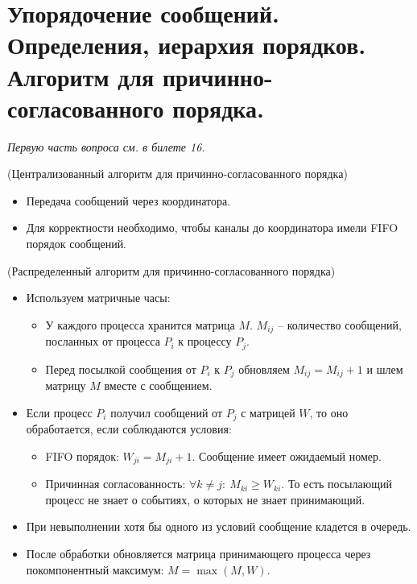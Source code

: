 \section{Упорядочение сообщений. Определения, иерархия порядков. Алгоритм для причинно-согласованного порядка.}

\textit{Первую часть вопроса см. в билете 16.}

\begin{algorithm}(Централизованный алгоритм для причинно-согласованного порядка)

    \begin{itemize}
        \item Передача сообщений через координатора.
        \item Для корректности необходимо, чтобы каналы до координатора имели FIFO порядок сообщений.
    \end{itemize}
\end{algorithm}

\begin{algorithm}(Распределенный алгоритм для причинно-согласованного порядка)

    \begin{itemize}
        \item Используем матричные часы:
        \begin{itemize}
            \item У каждого процесса хранится матрица $M$. $M_{ij}$ -- количество сообщений, посланных от процесса $P_i$ к процессу $P_j$.
            \item Перед посылкой сообщения от $P_i$ к $P_j$ обновляем $M_{ij} = M_{ij} + 1$ и шлем матрицу $M$ вместе с сообщением.
        \end{itemize}
        \item Если процесс $P_i$ получил сообщений от $P_j$ с матрицей $W$, то оно обработается, если соблюдаются условия:
        \begin{itemize}
            \item FIFO порядок: $W_{ji} = M_{ji} + 1$. Сообщение имеет ожидаемый номер.
            \item Причинная согласованность: $\forall k \not = j \colon~ M_{ki} \geqslant W_{ki}$. То есть посылающий процесс не знает о событиях, о которых не знает принимающий.
        \end{itemize}
        \item При невыполнении хотя бы одного из условий сообщение кладется в очередь.
        \item После обработки обновляется матрица принимающего процесса через покомпонентный максимум: $M = \max{(M, W)}$.
    \end{itemize}

\end{algorithm}
